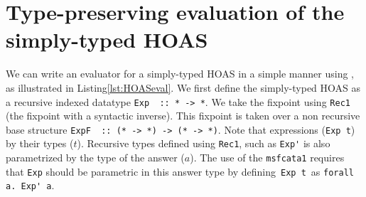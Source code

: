 \section{Type-preserving evaluation of the simply-typed HOAS}
\label{sec:HOASeval}
\vspace*{-1.5ex}
\vspace*{-.5ex}
We can write an evaluator for a simply-typed HOAS in a simple manner
using \msfit{*\to*}, as illustrated in Listing\;\ref{lst:HOASeval}.
We first define the simply-typed HOAS as a recursive indexed datatype
\lstinline{Exp  :: * -> *}. We take the fixpoint using \lstinline{Rec1}
(the fixpoint with a syntactic inverse). This fixpoint is taken over
a non recursive base structure \lstinline{ExpF  :: (* -> *) -> (* -> *)}.
Note that expressions (\lstinline{Exp t}) by their types ($t$).
Recursive types defined using \lstinline{Rec1}, such as \lstinline{Exp'}
is also parametrized by the type of the answer ($a$).
The use of the \lstinline{msfcata1} requires that \lstinline{Exp} should be
parametric in this answer type by defining
\,\lstinline{Exp t} \,as\;  \lstinline{forall a. Exp' a}. 

